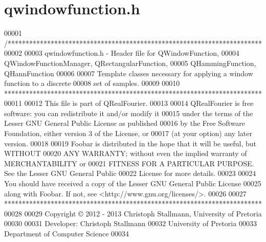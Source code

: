 \hypertarget{a00128_source}{\section{qwindowfunction.\+h}
\label{a00128_source}
}

\begin{DoxyCode}
00001 \textcolor{comment}{/***********************************************************************}
00002 \textcolor{comment}{}
00003 \textcolor{comment}{qwindowfunction.h - Header file for QWindowFunction,}
00004 \textcolor{comment}{                    QWindowFunctionManager, QRectangularFunction,}
00005 \textcolor{comment}{                    QHammingFunction, QHannFunction}
00006 \textcolor{comment}{}
00007 \textcolor{comment}{Template classes necessary for applying a window function to a discrete}
00008 \textcolor{comment}{set of samples.}
00009 \textcolor{comment}{}
00010 \textcolor{comment}{************************************************************************}
00011 \textcolor{comment}{}
00012 \textcolor{comment}{This file is part of QRealFourier.}
00013 \textcolor{comment}{}
00014 \textcolor{comment}{QRealFourier is free software: you can redistribute it and/or modify it}
00015 \textcolor{comment}{under the terms of the Lesser GNU General Public License as published}
00016 \textcolor{comment}{by the Free Software Foundation, either version 3 of the License, or}
00017 \textcolor{comment}{(at your option) any later version.}
00018 \textcolor{comment}{}
00019 \textcolor{comment}{Foobar is distributed in the hope that it will be useful, but WITHOUT}
00020 \textcolor{comment}{ANY WARRANTY; without even the implied warranty of MERCHANTABILITY or}
00021 \textcolor{comment}{FITNESS FOR A PARTICULAR PURPOSE.  See the Lesser GNU General Public}
00022 \textcolor{comment}{License for more details.}
00023 \textcolor{comment}{}
00024 \textcolor{comment}{You should have received a copy of the Lesser GNU General Public License}
00025 \textcolor{comment}{along with Foobar.  If not, see <http://www.gnu.org/licenses/>.}
00026 \textcolor{comment}{}
00027 \textcolor{comment}{************************************************************************}
00028 \textcolor{comment}{}
00029 \textcolor{comment}{Copyright © 2012 - 2013 Christoph Stallmann, University of Pretoria}
00030 \textcolor{comment}{}
00031 \textcolor{comment}{Developer: Christoph Stallmann}
00032 \textcolor{comment}{University of Pretoria}
00033 \textcolor{comment}{Department of Computer Science}
00034 \textcolor{comment}{}

\end{DoxyCode}
